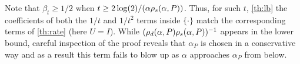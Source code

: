 Note that $\beta_t \ge 1/2$ when $t\ge2 \log(2)/(\alpha \rho_s(\alpha,P))$.
Thus, for such $t$, \cref{th:lb} 
the coefficients of both the $1/t$ and $1/t^2$ terms inside $\{ \cdot \}$ 
match the corresponding terms of \cref{th:rate} (here $U=I$).
While $(\rho_d(\alpha,P)\rho_s(\alpha,P))^{-1}$ appears in the lower bound, careful inspection
of the proof reveals that $\alpha_P$ is chosen in a conservative way 
and as a result this term fails to blow up as $\alpha$ approaches $\alpha_P$ from below.



